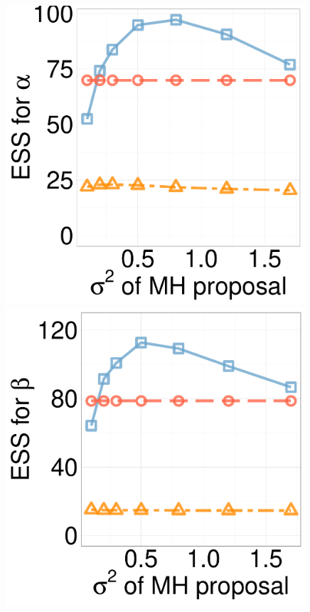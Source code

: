 \begin{figure}[H]
\begin{minipage}[hp]{0.24\linewidth}
	\end{minipage}
  \begin{minipage}[hp]{0.24\linewidth}
  \centering
    \includegraphics [width=0.99\textwidth, angle=0]{figs/ess/Q_D10alpha_k2.pdf}
	\end{minipage}
  \begin{minipage}[hp]{0.24\linewidth}
  \centering
    \includegraphics [width=0.99\textwidth, angle=0]{figs/ess/Q_D10beta_k2.pdf}

\end{minipage}
\end{figure}
